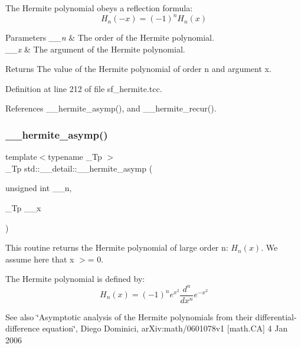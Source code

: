 The Hermite polynomial obeys a reflection formula\+: \[ H_n(-x) = (-1)^n H_n(x) \]


\begin{DoxyParams}{Parameters}
{\em \+\_\+\+\_\+n} & The order of the Hermite polynomial. \\
\hline
{\em \+\_\+\+\_\+x} & The argument of the Hermite polynomial. \\
\hline
\end{DoxyParams}
\begin{DoxyReturn}{Returns}
The value of the Hermite polynomial of order n and argument x. 
\end{DoxyReturn}


Definition at line 212 of file sf\+\_\+hermite.\+tcc.



References \+\_\+\+\_\+hermite\+\_\+asymp(), and \+\_\+\+\_\+hermite\+\_\+recur().

\mbox{\label{namespacestd_1_1____detail_ae44761bc16e62979edeccf4535ec553a}} 
\subsubsection{\texorpdfstring{\+\_\+\+\_\+hermite\+\_\+asymp()}{\_\_hermite\_asymp()}}
{\footnotesize\ttfamily template$<$typename \+\_\+\+Tp $>$ \\
\+\_\+\+Tp std\+::\+\_\+\+\_\+detail\+::\+\_\+\+\_\+hermite\+\_\+asymp (\begin{DoxyParamCaption}\item[{unsigned int}]{\+\_\+\+\_\+n,  }\item[{\+\_\+\+Tp}]{\+\_\+\+\_\+x }\end{DoxyParamCaption})}



This routine returns the Hermite polynomial of large order n\+: $ H_n(x) $. We assume here that x $>$= 0. 

The Hermite polynomial is defined by\+: \[ H_n(x) = (-1)^n e^{x^2} \frac{d^n}{dx^n} e^{-x^2} \]

\begin{DoxySeeAlso}{See also}
\char`\"{}\+Asymptotic analysis of the Hermite polynomials
      from their differential-\/difference equation\char`\"{}, Diego Dominici, ar\+Xiv\+:math/0601078v1 \mbox{[}math.\+CA\mbox{]} 4 Jan 2006 
\end{DoxySeeAlso}

